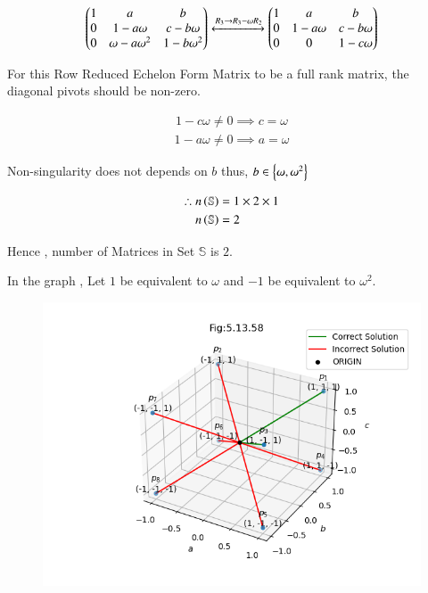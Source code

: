 \documentclass[journal]{IEEEtran}
\numberwithin{equation}{enumi}
\numberwithin{figure}{enumi}
\begin{document}
\begin{align}
    \begin{pmatrix}1 & a & b \\ 0 & 1-a\omega & c-b\omega \\ 0 & \omega - a\omega^2 & 1-b\omega^2\end{pmatrix} \xleftrightarrow[]{R_3\rightarrow R_3 - \omega R_2 }\begin{pmatrix}1 & a & b \\ 0 & 1-a\omega & c-b\omega \\ 0 & 0 & 1-c\omega\end{pmatrix}
\end{align}

For this Row Reduced Echelon Form Matrix to be a full rank matrix, 
the diagonal pivots should be non-zero.

\begin{align}
    1-c\omega \neq 0 \implies c = \omega
\end{align}
\begin{align}
    1-a\omega \neq 0 \implies a = \omega
\end{align}

Non-singularity does not depends on $b$ thus, $b \in \left\{\omega , \omega^2\right\} $

\begin{align}
    \therefore n\left(\mathbb{S}\right) &= 1 \times 2 \times 1 \\
               n\left(\mathbb{S}\right) &= 2
\end{align}

Hence , number of Matrices in Set $\mathbb{S}$ is $2$.

In the graph , Let $1$ be equivalent to $\omega$ and $-1$ be equivalent to $\omega^2$. 

\begin{figure}[H]
    \centering
    \includegraphics[width=1.0\columnwidth]{figs/vector1.png}
    \caption*{}
    \label{fig:placeholder}
\end{figure}
\end{document}
